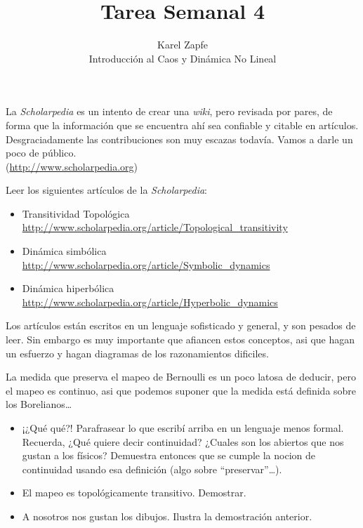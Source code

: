 \documentclass[12pt]{article}
\newenvironment{problem}[2][Problema]{\begin{trivlist}
\item[\hskip \labelsep {\bfseries #1}\hskip \labelsep {\bfseries #2.}]}{\end{trivlist}}
\newenvironment{question}[2][Pregunta]{\begin{trivlist}
\item[\hskip \labelsep {\bfseries #1}\hskip \labelsep {\bfseries #2.}]}{\end{trivlist}}
\begin{document}
 
 
\title{Tarea Semanal 4}%
\author{Karel Zapfe\\ %
Introducción al Caos y Dinámica No Lineal} %
 
\maketitle

La \emph{Scholarpedia} es un intento de crear una \emph{wiki},
pero revisada por pares, de forma que la información que se encuentra ahí 
sea confiable y citable en artículos. Desgraciadamente las contribuciones
son muy escazas todavía. Vamos a darle un poco de público. \\
(\url{http://www.scholarpedia.org})

\begin{problem}{Lecturas}

Leer los siguientes artículos de la \emph{Scholarpedia}:

\begin{itemize}
\item Transitividad Topológica \\
  \url{http://www.scholarpedia.org/article/Topological_transitivity}
\item Dinámica simbólica\\
  \url{http://www.scholarpedia.org/article/Symbolic_dynamics}
  \item Dinámica hiperbólica \\
    \url{http://www.scholarpedia.org/article/Hyperbolic_dynamics}
\end{itemize}
Los artículos están escritos en un lenguaje sofisticado y general, y son
pesados de leer. Sin embargo es muy importante que afiancen estos conceptos,
asi que hagan un esfuerzo y hagan diagramas de los razonamientos dificiles.
\end{problem}

\begin{question}{1}

La medida que preserva el mapeo de Bernoulli es un poco
latosa de deducir, pero el mapeo es continuo, asi que podemos
suponer que la medida está definida sobre los Borelianos\ldots
\begin{itemize}
  \item ¡¿Qué qué?! Parafrasear lo que escribí arriba en un lenguaje
    menos formal. Recuerda, ¿Qué quiere decir continuidad? 
    ¿Cuales son los abiertos que nos gustan a los físicos?
    Demuestra entonces que se cumple la nocion de continuidad usando
    esa definición (algo sobre ``preservar''\ldots).
  \item El mapeo es topológicamente transitivo. Demostrar.
  \item A nosotros nos gustan los dibujos. Ilustra la demostración anterior.

\end{itemize}      

\end{question}
\end{document}
